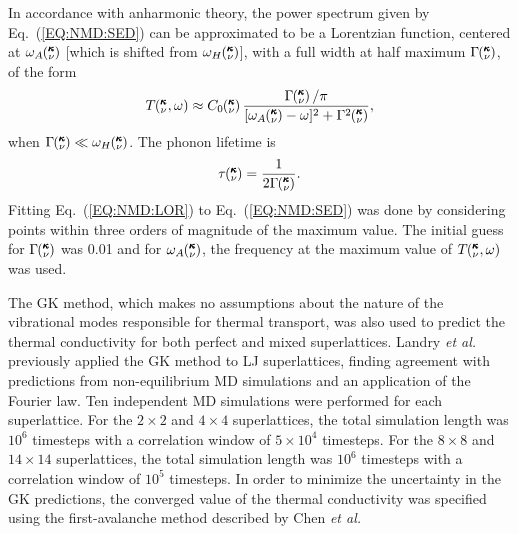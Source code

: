 \documentclass[aps,prb,preprint,preprintnumbers,amsmath,amssymb,floatfix,superscriptaddress]{revtex4}
\newcommand{\kvw}{\mspace{-4.0mu}\left(\mspace{-8.0mu}
\begin{smallmatrix}&\pmb{\kappa} \\&\nu\end{smallmatrix}
\mspace{-2.0mu},\omega\right)}
\newcommand{\kv}{\mspace{-4.0mu}\left(\mspace{-8.0mu}
\begin{smallmatrix}&\pmb{\kappa} \\&\nu\end{smallmatrix}
\mspace{-3.0mu}\right)}
\begin{document}
In accordance with anharmonic theory,\cite{maradudin_scattering_1962} the power spectrum given by Eq.~(\ref{EQ:NMD:SED}) can be approximated to be a Lorentzian function, centered at $\omega_A\kv$ [which is shifted from $\omega_H\kv$],  with a full width at half maximum $\Gamma\kv$, of the form 
\begin{equation}\label{EQ:NMD:LOR}
T\kvw \approx C_0\kv\frac{\Gamma\kv/\pi}{[\omega_A\kv-\omega]^2+\Gamma^2\kv},
\end{equation}
when $\Gamma\kv \ll \omega_H\kv$. The phonon lifetime is\cite {maradudin_scattering_1962}
\begin{equation}\label{EQ:lifetime}
\tau\kv=\frac{1}{2\Gamma\kv}.
\end{equation}
Fitting Eq.~(\ref{EQ:NMD:LOR}) to Eq.~(\ref{EQ:NMD:SED}) was done by considering points within three orders of magnitude of the maximum value. The initial guess for $\Gamma\kv$ was 0.01 and for $\omega_A\kv$, the frequency at the maximum value of $T\kvw$ was used. 

The GK method, which makes no assumptions about the nature of the vibrational modes responsible for thermal transport, was also used to predict the thermal conductivity for both perfect and mixed superlattices. Landry \textit{et al.} previously applied the GK method to LJ superlattices, finding agreement with predictions from non-equilibrium MD simulations and an application of the Fourier law.\cite{PhysRevB.79.075316}
Ten independent MD simulations were performed for each superlattice. For the $2 \times 2$ and $4 \times 4$ superlattices, the total  simulation length was $10^6$ timesteps with a correlation window of $5\times 10^4$ timesteps.  For the $8 \times 8$ and $14 \times 14$ superlattices, the total  simulation length was $10^6$ timesteps with a correlation window of $10^5$ timesteps. In order to minimize the uncertainty in the GK predictions, the converged value of the thermal conductivity was specified using the first-avalanche method described by Chen \textit{et al.} \cite{Chen20102392}

\end{document}
